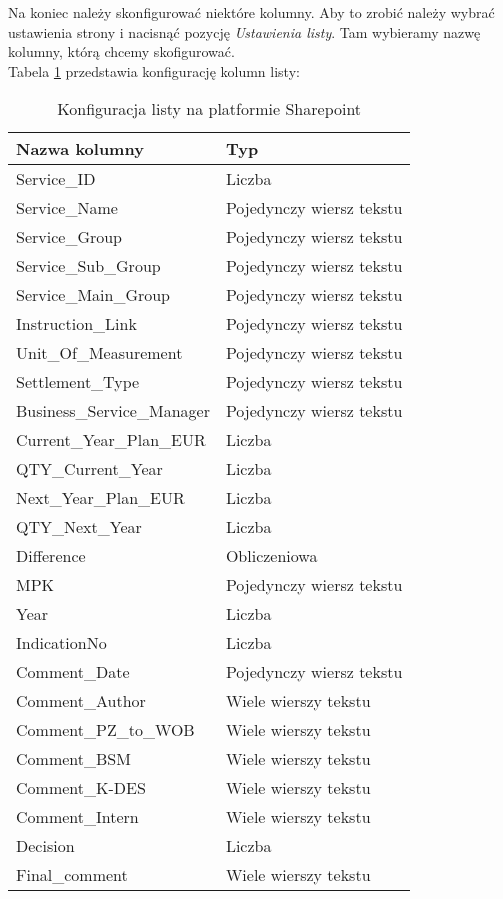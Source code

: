 Na koniec należy skonfigurować niektóre kolumny. Aby to zrobić należy wybrać ustawienia strony i nacisnąć pozycję \emph{Ustawienia listy}. Tam wybieramy nazwę kolumny, którą chcemy skofigurować.\\
Tabela \ref{tab:SharepointList} przedstawia konfigurację kolumn listy:
\begin{table}[h]
    \centering
    \caption{Konfiguracja listy na platformie Sharepoint}
    \label{tab:SharepointList}
\begin{tabular}{|l|l|}
    \hline
    \textbf{Nazwa kolumny} & \textbf{Typ} \\ \hline
    Service\_ID & Liczba \\ \hline
    Service\_Name & Pojedynczy wiersz tekstu \\ \hline
    Service\_Group & Pojedynczy wiersz tekstu \\ \hline
    Service\_Sub\_Group & Pojedynczy wiersz tekstu \\ \hline
    Service\_Main\_Group & Pojedynczy wiersz tekstu \\ \hline
    Instruction\_Link & Pojedynczy wiersz tekstu \\ \hline
    Unit\_Of\_Measurement & Pojedynczy wiersz tekstu \\ \hline
    Settlement\_Type & Pojedynczy wiersz tekstu \\ \hline
    Business\_Service\_Manager & Pojedynczy wiersz tekstu \\ \hline
    Current\_Year\_Plan\_EUR & Liczba \\ \hline
    QTY\_Current\_Year & Liczba \\ \hline
    Next\_Year\_Plan\_EUR & Liczba \\ \hline
    QTY\_Next\_Year & Liczba \\ \hline
    Difference & Obliczeniowa \\ \hline
    MPK & Pojedynczy wiersz tekstu \\ \hline
    Year & Liczba \\ \hline
    IndicationNo & Liczba \\ \hline
    Comment\_Date & Pojedynczy wiersz tekstu \\ \hline
    Comment\_Author & Wiele wierszy tekstu \\ \hline
    Comment\_PZ\_to\_WOB & Wiele wierszy tekstu \\ \hline
    Comment\_BSM & Wiele wierszy tekstu \\ \hline
    Comment\_K-DES & Wiele wierszy tekstu \\ \hline
    Comment\_Intern & Wiele wierszy tekstu \\ \hline
    Decision & Liczba \\ \hline
    Final\_comment & Wiele wierszy tekstu \\ \hline
    \end{tabular}
\end{table}

